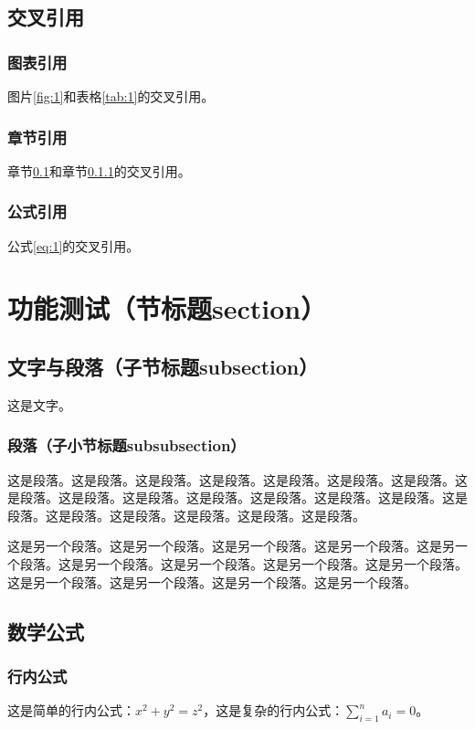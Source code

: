 \documentclass[UTF8, zihao = -4, linespread = 1.335, heading = true, fontset = none]{ctexart}
\begin{document}
\subsection{交叉引用}\label{sec:1}
\subsubsection{图表引用}\label{sec:2}
图片\ref{fig:1}和表格\ref{tab:1}的交叉引用。
\subsubsection{章节引用}
章节\ref{sec:1}和章节\ref{sec:2}的交叉引用。
\subsubsection{公式引用}
公式\ref{eq:1}的交叉引用。
\section{功能测试（节标题section）}
\subsection{文字与段落（子节标题subsection）}
这是文字。
\subsubsection{段落（子小节标题subsubsection）}
这是段落。这是段落。这是段落。这是段落。这是段落。这是段落。这是段落。这是段落。这是段落。这是段落。这是段落。这是段落。这是段落。这是段落。这是段落。这是段落。这是段落。这是段落。这是段落。这是段落。

这是另一个段落。这是另一个段落。这是另一个段落。这是另一个段落。这是另一个段落。这是另一个段落。这是另一个段落。这是另一个段落。这是另一个段落。这是另一个段落。这是另一个段落。这是另一个段落。这是另一个段落。
\subsection{数学公式}
\subsubsection{行内公式}
这是简单的行内公式：$x^2+y^2=z^2$，这是复杂的行内公式：$\sum_{i=1}^n a_i=0$。
\end{document}

